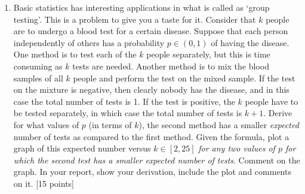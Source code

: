\documentclass[11pt]{article}
\begin{document}
\begin{enumerate}
\item Basic statistics has interesting applications in what is called as `group testing'. This is a problem to give you a taste for it. Consider that $k$ people are to undergo a blood test for a certain disease. Suppose that each person independently of others has a probability $p \in (0,1)$ of having the disease. One method is to test each of the $k$ people separately, but this is time consuming as $k$ tests are needed. Another method is to mix the blood samples of all $k$ people and perform the test on the mixed sample. If the test on the mixture is negative, then clearly nobody has the disease, and in this case the total number of tests is 1. If the test is positive, the $k$ people have to be tested separately, in which case the total number of tests is $k+1$. Derive for what values of $p$ (in terms of $k$), the second method has a smaller \emph{expected} number of tests as compared to the first method. Given the formula, plot a graph of this expected number versus $k \in [2,25]$ \textit{for any two values of $p$ for which the second test has a smaller expected number of tests}. Comment on the graph. In your report, show your derivation, include the plot and comments on it. \textsf{[15 points]}


\end{enumerate}
\end{document}
